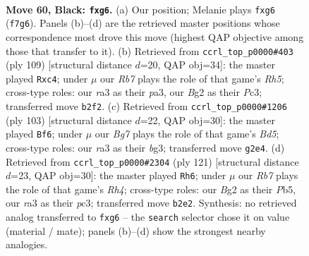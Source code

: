 \documentclass[11pt]{article}
\begin{document}
\clearpage

\begin{figure}[p]\centering
\begin{subfigure}{0.46\textwidth}\centering
\resizebox{\linewidth}{!}{%
\newchessgame
\chessboard[
  setfen={5k2/5p2/6P1/1R6/1P6/R7/1r4b1/6K1 b - - 0 60},
  showmover=false,
  pgfstyle=straightmove, color=movearrow, markmove={f7-g6}
]}
\caption{}
\end{subfigure}\hfill
\begin{subfigure}{0.46\textwidth}\centering
\resizebox{\linewidth}{!}{%
\newchessgame
\chessboard[
  setfen={8/7R/2k3pP/8/2P4r/P1pK4/8/8 b - - 0 55},
  showmover=false,
  pgfstyle=straightmove, color=movearrow, markmove={h4-c4}
]}
\caption{}
\end{subfigure}
\\[4pt]
\begin{subfigure}{0.46\textwidth}\centering
\resizebox{\linewidth}{!}{%
\newchessgame
\chessboard[
  setfen={8/8/6k1/R6p/P2b3P/6B1/r7/5K2 b - - 16 52},
  showmover=false,
  pgfstyle=straightmove, color=movearrow, markmove={d4-f6}
]}
\caption{}
\end{subfigure}\hfill
\begin{subfigure}{0.46\textwidth}\centering
\resizebox{\linewidth}{!}{%
\newchessgame
\chessboard[
  setfen={7R/k6P/8/1p5r/6K1/2P5/8/8 b - - 20 61},
  showmover=false,
  pgfstyle=straightmove, color=movearrow, markmove={h5-h6}
]}
\caption{}
\end{subfigure}
\caption{\textbf{Move 60, Black: \texttt{fxg6}.} (a) Our position; Melanie plays \texttt{fxg6} (\texttt{f7g6}). Panels (b)--(d) are the retrieved master positions whose correspondence most drove this move (highest QAP objective among those that transfer to it). (b) Retrieved from \texttt{ccrl\_top\_p0000\#403} (ply 109) [structural distance $d$=20, QAP obj=34]: the master played \texttt{Rxc4}; under $\mu$ our \emph{Rb7} plays the role of that game's \emph{Rh5}; cross-type roles: our \emph{r}a3 as their \emph{p}a3, our \emph{B}g2 as their \emph{P}c3; transferred move \texttt{b2f2}. (c) Retrieved from \texttt{ccrl\_top\_p0000\#1206} (ply 103) [structural distance $d$=22, QAP obj=30]: the master played \texttt{Bf6}; under $\mu$ our \emph{Bg7} plays the role of that game's \emph{Bd5}; cross-type roles: our \emph{r}a3 as their \emph{b}g3; transferred move \texttt{g2e4}. (d) Retrieved from \texttt{ccrl\_top\_p0000\#2304} (ply 121) [structural distance $d$=23, QAP obj=30]: the master played \texttt{Rh6}; under $\mu$ our \emph{Rb7} plays the role of that game's \emph{Rh4}; cross-type roles: our \emph{B}g2 as their \emph{P}b5, our \emph{r}a3 as their \emph{p}c3; transferred move \texttt{b2e2}. Synthesis: no retrieved analog transferred to \texttt{fxg6} -- the \texttt{search} selector chose it on value (material / mate); panels (b)--(d) show the strongest nearby analogies.}
\label{fig:thought-m119}
\end{figure}
\end{document}
